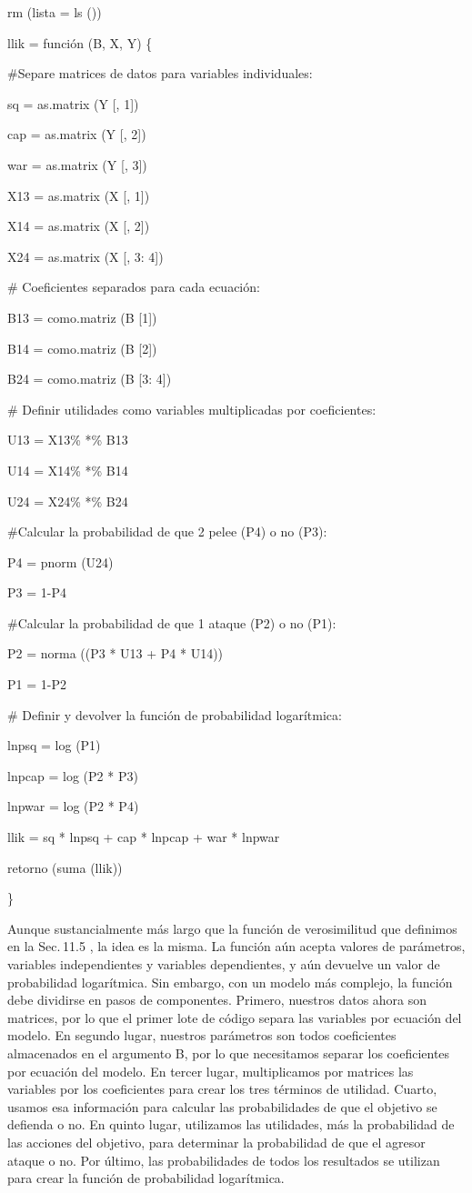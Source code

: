 \documentclass[
]{book}
\begin{document}
rm (lista = ls ())

llik = función (B, X, Y) \{

\#Separe matrices de datos para variables individuales:

sq = as.matrix (Y {[}, 1{]})

cap = as.matrix (Y {[}, 2{]})

war = as.matrix (Y {[}, 3{]})

X13 = as.matrix (X {[}, 1{]})

X14 = as.matrix (X {[}, 2{]})

X24 = as.matrix (X {[}, 3: 4{]})

\# Coeficientes separados para cada ecuación:

B13 = como.matriz (B {[}1{]})

B14 = como.matriz (B {[}2{]})

B24 = como.matriz (B {[}3: 4{]})

\# Definir utilidades como variables multiplicadas por coeficientes:

U13 = X13\% *\% B13

U14 = X14\% *\% B14

U24 = X24\% *\% B24

\#Calcular la probabilidad de que 2 pelee (P4) o no (P3):

P4 = pnorm (U24)

P3 = 1-P4

\#Calcular la probabilidad de que 1 ataque (P2) o no (P1):

P2 = norma ((P3 * U13 + P4 * U14))

P1 = 1-P2

\# Definir y devolver la función de probabilidad logarítmica:

lnpsq = log (P1)

lnpcap = log (P2 * P3)

lnpwar = log (P2 * P4)

llik = sq * lnpsq + cap * lnpcap + war * lnpwar

retorno (suma (llik))

\}

Aunque sustancialmente más largo que la función de verosimilitud que definimos en la Sec. 11.5 , la idea es la misma. La función aún acepta valores de parámetros, variables independientes y variables dependientes, y aún devuelve un valor de probabilidad logarítmica. Sin embargo, con un modelo más complejo, la función debe dividirse en pasos de componentes. Primero, nuestros datos ahora son matrices, por lo que el primer lote de código separa las variables por ecuación del modelo. En segundo lugar, nuestros parámetros son todos coeficientes almacenados en el argumento B, por lo que necesitamos separar los coeficientes por ecuación del modelo. En tercer lugar, multiplicamos por matrices las variables por los coeficientes para crear los tres términos de utilidad. Cuarto, usamos esa información para calcular las probabilidades de que el objetivo se defienda o no. En quinto lugar, utilizamos las utilidades, más la probabilidad de las acciones del objetivo, para determinar la probabilidad de que el agresor ataque o no. Por último, las probabilidades de todos los resultados se utilizan para crear la función de probabilidad logarítmica.
\end{document}
